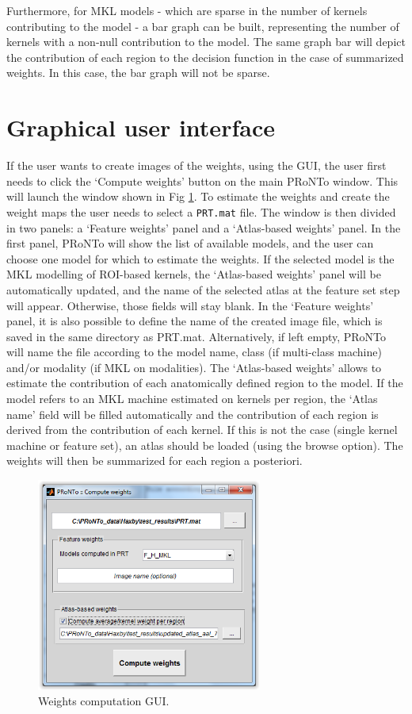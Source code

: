 Furthermore, for MKL models - which are sparse in the number of kernels contributing to the model - a bar graph can be built, representing the number of kernels with a non-null contribution to the model. The same graph bar will depict the contribution of each region to the decision function in the case of summarized weights. In this case, the bar graph will not be sparse.

\section{Graphical user interface}

If the user wants to create images of the weights, using the GUI, the user first needs to click the `Compute weights' button
on the main PRoNTo window. This will launch the window shown in Fig \ref{CompWeights}. To estimate the weights and create the
weight maps the user needs to select a {\tt PRT.mat} file. The window is then divided in two panels: a `Feature weights' panel
and a `Atlas-based weights' panel. In the first panel, PRoNTo will show the list of available models, and the user can choose
one model for which to estimate the weights. If the selected model is the MKL modelling of ROI-based kernels, the `Atlas-based
weights' panel will be automatically updated, and the name of the selected atlas at the feature set step will appear.
Otherwise, those fields will stay blank. In the `Feature weights' panel, it is also possible to define the name of the created
image file, which is saved in the same directory as PRT.mat. Alternatively, if left empty, PRoNTo will name the file according to the model name, class (if multi-class machine) and/or modality (if MKL on modalities). The `Atlas-based weights' allows to estimate the contribution of each anatomically defined region to the model. If the model refers to an MKL machine estimated on kernels per region, the `Atlas name' field will be filled automatically and the contribution of each region is derived from the contribution of each kernel. If this is not the case (single kernel machine or feature set), an atlas should be loaded (using the browse option). The weights will then be summarized for each region a posteriori.

\begin{figure}[h!]
\begin{center}
	\includegraphics[height=7cm]{images/CompWeights.png}
	\caption{Weights computation GUI.}
	\label{CompWeights}
\end{center}
\end{figure}

